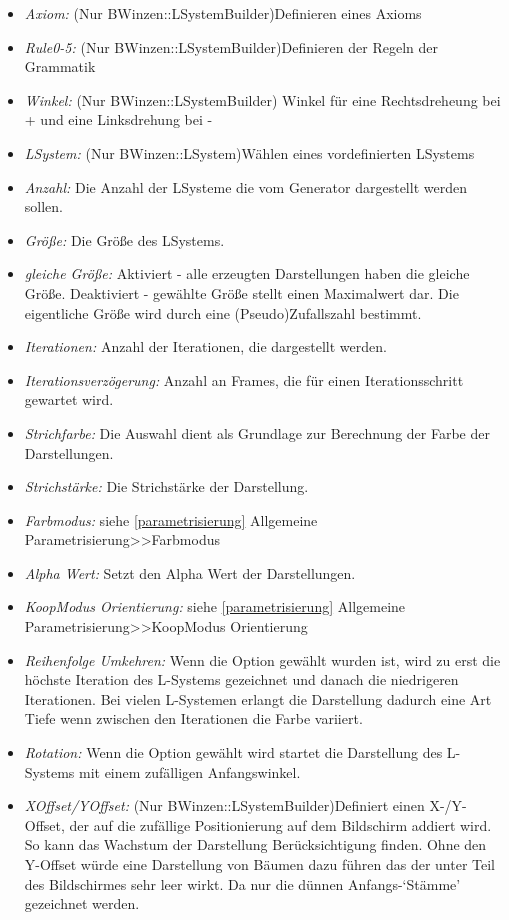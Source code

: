 \documentclass[../mciAusarbeitung.tex]{subfiles}
\begin{document}
	\begin{itemize}
	\setlength\itemsep{-0.1em}
		\item\textit{Axiom:} (Nur BWinzen::LSystemBuilder)Definieren eines Axioms
		\item\textit{Rule0-5:} (Nur BWinzen::LSystemBuilder)Definieren der Regeln der Grammatik
		\item\textit{Winkel:} (Nur BWinzen::LSystemBuilder) Winkel für eine Rechtsdreheung bei + und eine Linksdrehung bei - 
		\item\textit{LSystem:} (Nur BWinzen::LSystem)Wählen eines vordefinierten LSystems
		\item\textit{Anzahl:} Die Anzahl der LSysteme die vom Generator dargestellt werden sollen.
		\item\textit{Größe:} Die Größe des LSystems.
		\item\textit{gleiche Größe:} Aktiviert - alle erzeugten Darstellungen haben die gleiche Größe.  Deaktiviert - gewählte Größe stellt einen Maximalwert dar. Die eigentliche Größe wird durch eine (Pseudo)Zufallszahl bestimmt.
		\item\textit{Iterationen:} Anzahl der Iterationen, die dargestellt werden.
		\item\textit{Iterationsverzögerung:} Anzahl an Frames, die für einen Iterationsschritt gewartet wird.
		\item\textit{Strichfarbe:} Die Auswahl dient als Grundlage zur Berechnung der Farbe der Darstellungen. 
		\item\textit{Strichstärke:} Die Strichstärke der Darstellung.
		\item\textit{Farbmodus:} siehe \ref{parametrisierung} Allgemeine Parametrisierung>>Farbmodus
		\item\textit{Alpha Wert:} Setzt den Alpha Wert der Darstellungen. 
		\item\textit{KoopModus Orientierung:}  siehe \ref{parametrisierung} Allgemeine Parametrisierung>>KoopModus Orientierung
		\item\textit{Reihenfolge Umkehren:} Wenn die Option gewählt wurden ist, wird zu erst die höchste Iteration des L-Systems gezeichnet und danach die niedrigeren Iterationen. Bei vielen L-Systemen erlangt die Darstellung dadurch eine Art Tiefe wenn zwischen den Iterationen die Farbe variiert. 
		\item\textit{Rotation:} Wenn die Option gewählt wird startet die Darstellung des L-Systems mit einem zufälligen Anfangswinkel.
		\item\textit{XOffset/YOffset:} (Nur BWinzen::LSystemBuilder)Definiert einen X-/Y-Offset, der auf die zufällige Positionierung auf dem Bildschirm addiert wird. So kann das Wachstum der Darstellung Berücksichtigung finden. Ohne den Y-Offset würde eine Darstellung von Bäumen dazu führen das der unter Teil des Bildschirmes sehr leer wirkt. Da nur die dünnen Anfangs-`Stämme' gezeichnet werden.
	\end{itemize}
\end{document}
